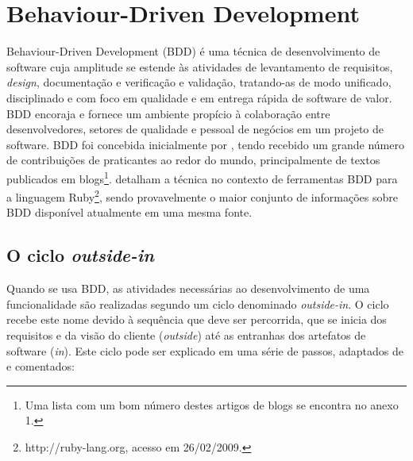 \documentclass[a4paper,abntfigtabnum,noindentfirst]{abnt}
\begin{document}
\chapter{Behaviour-Driven Development}

Behaviour-Driven Development (BDD) é uma técnica de desenvolvimento de software cuja amplitude se estende às atividades de levantamento de requisitos, \textit{design}, documentação e verificação e validação, tratando-as de modo unificado, disciplinado e com foco em qualidade e em entrega rápida de software de valor. BDD encoraja e fornece um ambiente propício à colaboração entre desenvolvedores, setores de qualidade e pessoal de negócios em um projeto de software. BDD foi concebida inicialmente por , tendo recebido um grande número de contribuições de praticantes ao redor do mundo, principalmente de textos publicados em blogs\footnote{Uma lista com um bom número destes artigos de blogs se encontra no anexo 1.}.  detalham a técnica no contexto de ferramentas BDD para a linguagem Ruby\footnote{http://ruby-lang.org, acesso em 26/02/2009.}, sendo provavelmente o maior conjunto de informações sobre BDD disponível atualmente em uma mesma fonte.

\section{O ciclo \textit{outside-in}}

Quando se usa BDD, as atividades necessárias ao desenvolvimento de uma funcionalidade são realizadas segundo  um ciclo denominado \textit{outside-in}. O ciclo recebe este nome devido à sequência que deve ser percorrida, que se inicia dos requisitos e da visão do cliente (\textit{outside}) até as entranhas dos artefatos de software (\textit{in}). Este ciclo pode ser explicado em uma série de passos, adaptados de  e comentados:
\end{document}
